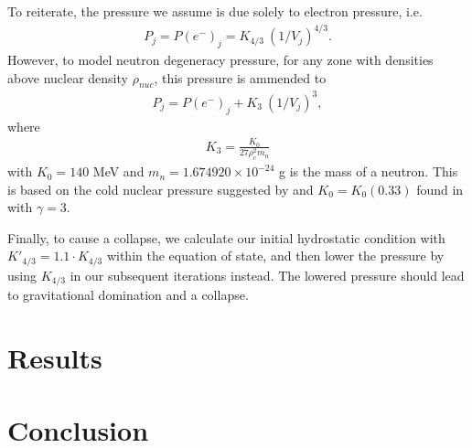 \documentclass[12pt]{article}
\begin{document}
To reiterate, the pressure we assume is due solely to electron pressure, i.e.
$$
\begin{aligned}
P_j = P(e^-)_j = K_{4/3}\ (1 / V_j)^{4/3}.
\end{aligned}
$$
However, to model neutron degeneracy pressure, for any zone with densities
above nuclear density $\rho_{nuc}$, this pressure is ammended to
$$
\begin{aligned}
P_j = P(e^-)_j + K_3\ (1 / V_j)^3,
\end{aligned}
$$
where
$$
\begin{aligned}
K_3 = \frac{K_0}{27 \rho_c^2 m_n}
\end{aligned}
$$
with $K_0 = 140$ MeV and $m_n = 1.674920 \times 10^{-24}$ g is the mass of a
neutron. This is based on the cold nuclear pressure suggested by and
$K_0 = K_0(0.33)$ found in \citet{bck85} with $\gamma = 3$.

Finally, to cause a collapse, we calculate our initial hydrostatic condition
with $K'_{4/3} = 1.1 \cdot K_{4/3}$ within the equation of state, and then
lower the pressure by using $K_{4/3}$ in our subsequent iterations instead. The
lowered pressure should lead to gravitational domination and a collapse.


\section{Results}






\section{Conclusion}




\end{document}
